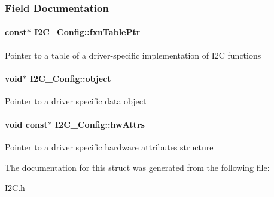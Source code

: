 \subsubsection{Field Documentation}
\paragraph[{fxn\-Table\-Ptr}]{ const$\ast$ I2\-C\-\_\-\-Config\-::fxn\-Table\-Ptr}\label{struct_i2_c___config_a225800ca2923178397645d520bc6a0c1}
Pointer to a table of a driver-\/specific implementation of I2\-C functions 
\paragraph[{object}]{\setlength{\rightskip}{0pt plus 5cm}void$\ast$ I2\-C\-\_\-\-Config\-::object}\label{struct_i2_c___config_abeb7af699744bd43dc1fc5019073fd2c}
Pointer to a driver specific data object 
\paragraph[{hw\-Attrs}]{\setlength{\rightskip}{0pt plus 5cm}void const$\ast$ I2\-C\-\_\-\-Config\-::hw\-Attrs}\label{struct_i2_c___config_a1c623e253c0d5f896ad8037635f0c719}
Pointer to a driver specific hardware attributes structure 

The documentation for this struct was generated from the following file\-:\begin{DoxyCompactItemize}
\item 
\hyperlink{_i2_c_8h}{I2\-C.\-h}\end{DoxyCompactItemize}
